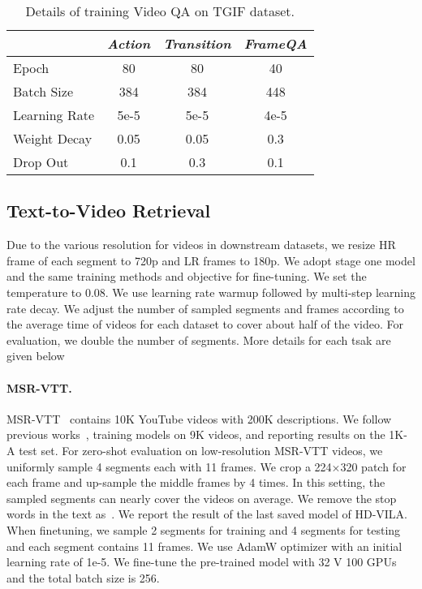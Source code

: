 \begin{table}[hbt!]
\small
    \centering
    \begin{tabular}{l c c c} 
    \hline
    ~ & \textit{Action} & \textit{Transition}  & \textit{FrameQA} \\\hline\hline
    Epoch & 80  & 80 & 40 \\ 
    Batch Size & 384  & 384 & 448 \\ 
    Learning Rate & 5e-5 & 5e-5 & 4e-5\\ 
    Weight Decay & 0.05 & 0.05 & 0.3 \\
    Drop Out & 0.1 & 0.3 & 0.1 \\
    \hline
    \end{tabular}
    \vspace{-3mm}
    \caption{Details of training Video QA on TGIF dataset.}
    \label{tab:supp_tgif}
\end{table}

\subsection{Text-to-Video Retrieval}

Due to the various resolution for videos in downstream datasets, we resize HR frame of each segment to 720p and LR frames to 180p.  We adopt stage one model and the same training methods and objective for fine-tuning. We set the temperature to 0.08. We use learning rate warmup followed by multi-step learning rate decay. We adjust the number of sampled segments and frames according to the average time of videos for each dataset to cover about half of the video. For evaluation, we double the number of segments. More details for each tsak are given below


\paragraph{MSR-VTT.} MSR-VTT~\cite{xu2016msr} contains 10K YouTube videos with 200K descriptions. We follow previous works~\cite{yu2018jsfusion,liu2019use}, training models on 9K videos, and reporting results on the 1K-A test set. For zero-shot evaluation on low-resolution MSR-VTT videos, we uniformly sample 4 segments each with 11 frames. We crop a 224×320 patch for each frame and up-sample the middle frames by 4 times. In this setting, the sampled segments can nearly cover the videos on average. We remove the stop words in the text as~\cite{miech2020end}. We report the result of the last saved model of HD-VILA. When finetuning, we sample 2 segments for training and 4 segments for testing and each segment contains 11 frames. We use AdamW optimizer with an initial learning rate of 1e-5. We fine-tune the pre-trained model with 32 V 100 GPUs and the total batch size is 256.

